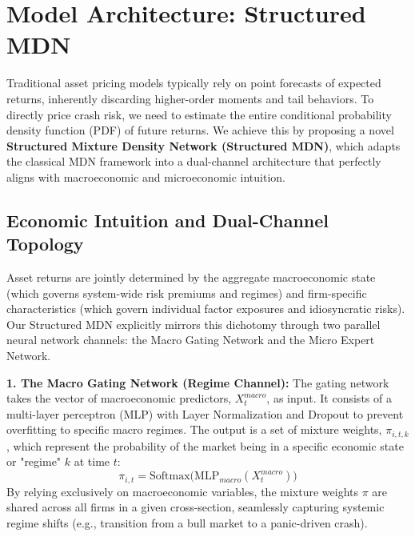 \documentclass[12pt]{article}
\begin{document}
\section{Model Architecture: Structured MDN}
\label{sec:model_architecture}

Traditional asset pricing models typically rely on point forecasts of expected returns, inherently discarding higher-order moments and tail behaviors. To directly price crash risk, we need to estimate the entire conditional probability density function (PDF) of future returns. We achieve this by proposing a novel \textbf{Structured Mixture Density Network (Structured MDN)}, which adapts the classical MDN framework  into a dual-channel architecture that perfectly aligns with macroeconomic and microeconomic intuition.

\subsection{Economic Intuition and Dual-Channel Topology}
\label{subsec:topology}

Asset returns are jointly determined by the aggregate macroeconomic state (which governs system-wide risk premiums and regimes) and firm-specific characteristics (which govern individual factor exposures and idiosyncratic risks). Our Structured MDN explicitly mirrors this dichotomy through two parallel neural network channels: the Macro Gating Network and the Micro Expert Network.



\textbf{1. The Macro Gating Network (Regime Channel):} 
The gating network takes the vector of macroeconomic predictors, $X_{t}^{macro}$, as input. It consists of a multi-layer perceptron (MLP) with Layer Normalization and Dropout to prevent overfitting to specific macro regimes. The output is a set of mixture weights, $\pi_{i,t,k}$, which represent the probability of the market being in a specific economic state or "regime" $k$ at time $t$:
\begin{equation}
    \pi_{i,t} = \text{Softmax}\Big( \text{MLP}_{macro}(X_{t}^{macro}) \Big)
\end{equation}
By relying exclusively on macroeconomic variables, the mixture weights $\pi$ are shared across all firms in a given cross-section, seamlessly capturing systemic regime shifts (e.g., transition from a bull market to a panic-driven crash).
\end{document}
